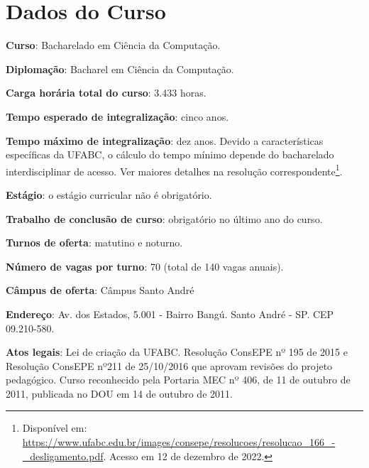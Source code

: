 \section{Dados do Curso}
\label{sec:dados_curso}

\textbf{Curso}: Bacharelado em Ciência da Computação.

\textbf{Diplomação}: Bacharel em Ciência da Computação.

\textbf{Carga horária total do curso}: 3.433 horas.

\textbf{Tempo esperado de integralização}: cinco anos.  

\textbf{Tempo máximo de integralização}: dez anos. Devido a características
específicas da UFABC, o cálculo do tempo mínimo depende do bacharelado
interdisciplinar de acesso. Ver maiores detalhes na resolução
correspondente\footnote{Disponível em:
\url{https://www.ufabc.edu.br/images/consepe/resolucoes/resolucao_166_-_desligamento.pdf}.
Acesso em 12 de dezembro de 2022.}.

\textbf{Estágio}: o estágio curricular não é obrigatório.

\textbf{Trabalho de conclusão de curso}: obrigatório no último ano do curso.

\textbf{Turnos de oferta}: matutino e noturno.

\textbf{Número de vagas por turno}: 70 (total de 140 vagas anuais).

\textbf{Câmpus de oferta}: Câmpus Santo André

\textbf{Endereço}: Av. dos Estados, 5.001 - Bairro Bangú. Santo André
- SP. CEP 09.210-580.

\textbf{Atos legais}: Lei de criação da UFABC. Resolução ConsEPE nº
195 de 2015 e Resolução ConsEPE nº211 de 25/10/2016 que aprovam
revisões do projeto pedagógico. Curso reconhecido pela Portaria MEC nº
406, de 11 de outubro de 2011, publicada no DOU em 14 de outubro de
2011.
